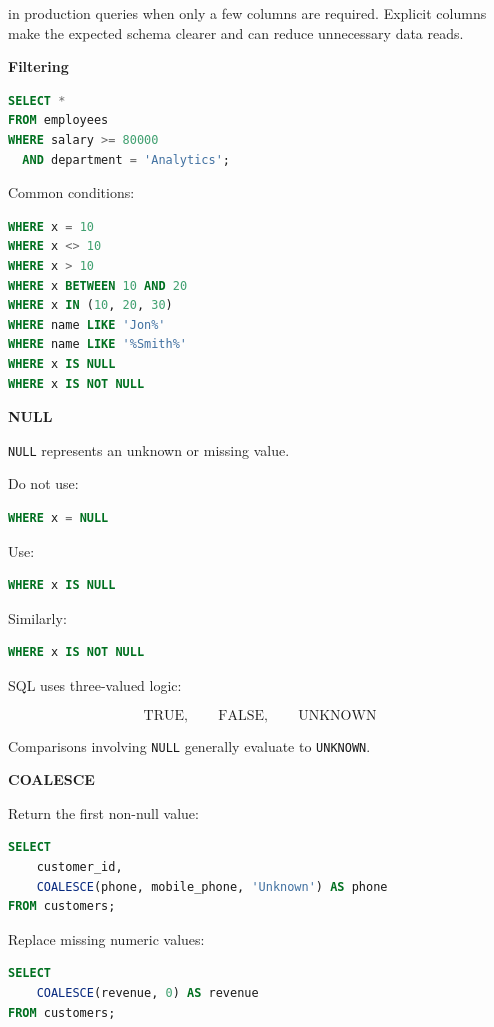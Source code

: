 \documentclass[11pt,letterpaper]{article}
\begin{document}
in production queries when only a few columns are required. Explicit columns
make the expected schema clearer and can reduce unnecessary data reads.

\textbf{Filtering}

\begin{lstlisting}[language=SQL]
SELECT *
FROM employees
WHERE salary >= 80000
  AND department = 'Analytics';
\end{lstlisting}

Common conditions:

\begin{lstlisting}[language=SQL]
WHERE x = 10
WHERE x <> 10
WHERE x > 10
WHERE x BETWEEN 10 AND 20
WHERE x IN (10, 20, 30)
WHERE name LIKE 'Jon%'
WHERE name LIKE '%Smith%'
WHERE x IS NULL
WHERE x IS NOT NULL
\end{lstlisting}

\textbf{NULL}

\texttt{NULL} represents an unknown or missing value.

Do not use:

\begin{lstlisting}[language=SQL]
WHERE x = NULL
\end{lstlisting}

Use:

\begin{lstlisting}[language=SQL]
WHERE x IS NULL
\end{lstlisting}

Similarly:

\begin{lstlisting}[language=SQL]
WHERE x IS NOT NULL
\end{lstlisting}

SQL uses three-valued logic:

\[
\text{TRUE},\qquad \text{FALSE},\qquad \text{UNKNOWN}
\]

Comparisons involving \texttt{NULL} generally evaluate to
\texttt{UNKNOWN}.

\textbf{COALESCE}

Return the first non-null value:

\begin{lstlisting}[language=SQL]
SELECT
    customer_id,
    COALESCE(phone, mobile_phone, 'Unknown') AS phone
FROM customers;
\end{lstlisting}

Replace missing numeric values:

\begin{lstlisting}[language=SQL]
SELECT
    COALESCE(revenue, 0) AS revenue
FROM customers;
\end{lstlisting}
\end{document}
